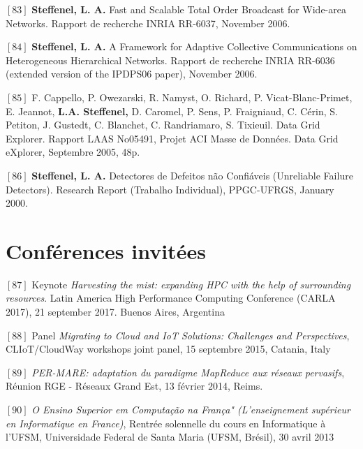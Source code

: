 \documentclass[final,twoside]{hdr} %
\begin{document}
\vspace{1em} \noindent $[83]$
\textbf{Steffenel, L. A.} {Fast and Scalable Total Order Broadcast for Wide-area Networks}. Rapport de recherche INRIA RR-6037, November 2006. 

\vspace{1em} \noindent $[84]$
\textbf{Steffenel, L. A.} {A Framework for Adaptive Collective Communications on Heterogeneous Hierarchical Networks}. Rapport de recherche INRIA RR-6036 (extended version of the IPDPS06 paper), November 2006.

\vspace{1em} \noindent $[85]$
F. Cappello, P. Owezarski, R. Namyst, O. Richard, P. Vicat-Blanc-Primet, E. Jeannot, \textbf{L.A. Steffenel,} D. Caromel, P. Sens, P. Fraigniaud, C. Cérin, S. Petiton, J. Gustedt, C. Blanchet, C. Randriamaro, S. Tixieuil. {Data Grid Explorer}. Rapport LAAS No05491, Projet ACI Masse de Données. Data Grid eXplorer, Septembre 2005, 48p. 

\vspace{1em} \noindent $[86]$
\textbf{Steffenel, L. A.} {Detectores de Defeitos não Confiáveis} (Unreliable Failure Detectors). Research Report (Trabalho Individual), PPGC-UFRGS, January 2000. 




\section*{Conférences invitées}

\noindent $[87]$ Keynote {\em Harvesting the mist: expanding HPC with the help of surrounding resources}. {Latin America High Performance Computing Conference (CARLA 2017)}, 21 september 2017. Buenos Aires, Argentina

\vspace{1em} \noindent $[88]$ Panel {\em Migrating to Cloud and IoT Solutions: Challenges and Perspectives}, {CLIoT/CloudWay workshops joint panel}, 15 septembre 2015, Catania, Italy

\vspace{1em} \noindent $[89]$ {\em PER-MARE: adaptation du paradigme MapReduce aux réseaux pervasifs}, {Réunion RGE - Réseaux Grand Est}, 13 février 2014, Reims.

\vspace{1em} \noindent $[90]$ {\em O Ensino Superior em Computação na França" (L'enseignement supérieur en Informatique en France)}, Rentrée solennelle du cours en Informatique à l'UFSM, {Universidade Federal de Santa Maria (UFSM, Brésil)}, 30 avril 2013
\end{document}
